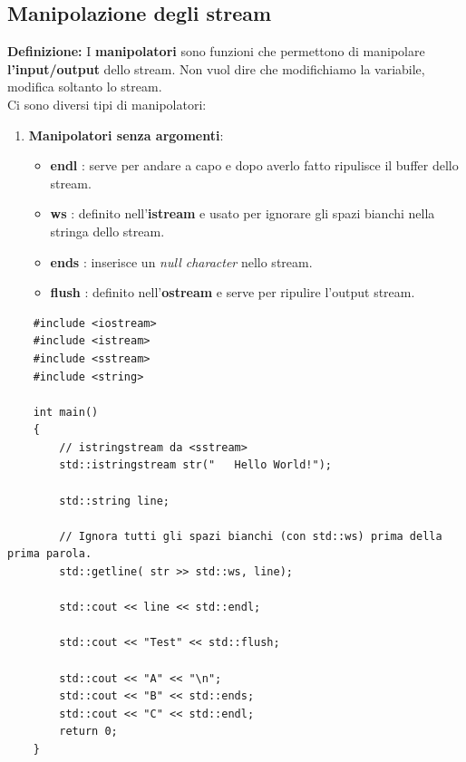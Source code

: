 \subsection{Manipolazione degli stream}

\textsf{\small \textbf{Definizione: } I \textbf{manipolatori} sono funzioni che permettono di manipolare \textbf{l'input/output} dello stream. Non vuol dire che modifichiamo la variabile, modifica soltanto lo stream.} \\

\textsf{\small Ci sono diversi tipi di manipolatori: } \\

\begin{enumerate}
	\item \textsf{\small \textbf{Manipolatori senza argomenti}: }
	\begin{itemize}
		\item \textsf{\small \textbf{endl} : serve per andare a capo e dopo averlo fatto ripulisce il buffer dello stream.}
		\item \textsf{\small \textbf{ws} : definito nell'\textbf{istream} e usato per ignorare gli spazi bianchi nella stringa dello stream.}
		\item \textsf{\small \textbf{ends} : inserisce un \emph{null character} nello stream.}
		\item \textsf{\small \textbf{flush} : definito nell'\textbf{ostream} e serve per ripulire l'output stream.}
	\end{itemize}
\end{enumerate}

\begin{lstlisting}
	#include <iostream>
	#include <istream>
	#include <sstream>
	#include <string>
	
	int main()
	{
		// istringstream da <sstream>
		std::istringstream str("   Hello World!");
		
		std::string line;
		
		// Ignora tutti gli spazi bianchi (con std::ws) prima della prima parola.
		std::getline( str >> std::ws, line);
		
		std::cout << line << std::endl;
		
		std::cout << "Test" << std::flush;
		
		std::cout << "A" << "\n";
		std::cout << "B" << std::ends;
		std::cout << "C" << std::endl;
		return 0;
	}
\end{lstlisting}

